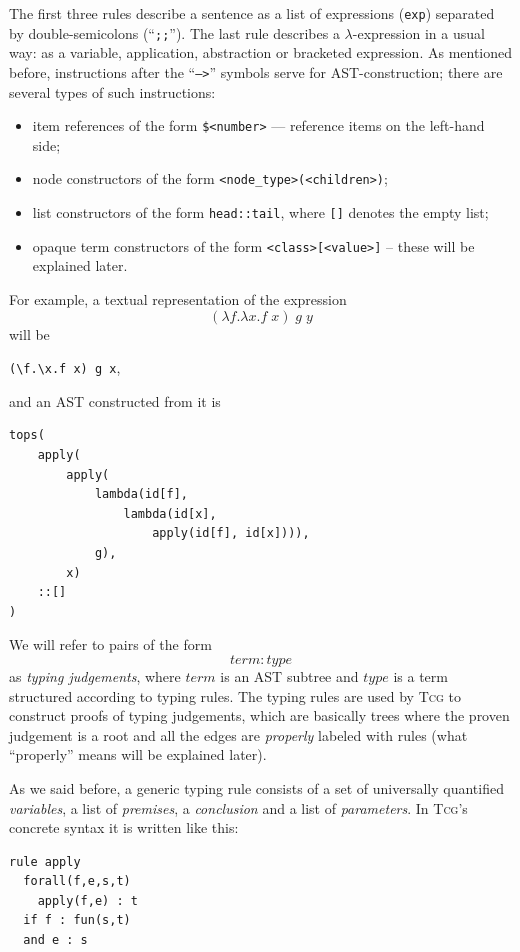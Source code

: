\documentclass[a4paper,12pt]{article}
\newcommand{\Tcg}{\textsc{Tcg}}
\newcommand{\code}[1]{\texttt{#1}}
\newcounter{premise}
\begin{document}
The first three rules describe a sentence as a list of expressions (\code{exp}) separated by double-semicolons (``\code{;;}''). The last rule describes a $\lambda$-expression in a usual way: as a variable, application, abstraction or bracketed expression. As mentioned before, instructions after the ``\code{-->}'' symbols serve for AST-construction; there are several types of such instructions:
\begin{itemize}
 \item item references of the form \code{\$<number>} --- reference items on the left-hand side;
 \item node constructors of the form \code{<node_type>(<children>)};
 \item list constructors of the form \code{head::tail}, where \code{[]} denotes the empty list;
 \item opaque term constructors of the form \code{<class>[<value>]} -- these will be explained later.
\end{itemize}

For example, a textual representation of the expression 
$$(\lambda f.\lambda x. f\; x)\; g\; y$$
will be 
\begin{center}
\code{(\textbackslash f.\textbackslash x.f x) g x},
\end{center}
and an AST constructed from it is%
\begin{verbatim}
tops(
    apply(
        apply(
            lambda(id[f], 
                lambda(id[x], 
                    apply(id[f], id[x]))),
            g),
        x)
    ::[]
)
\end{verbatim}

We will refer to pairs of the form
$$term : type$$
as \emph{typing judgements}, where $term$ is an AST subtree and $type$ is a term structured according to typing rules. The typing rules are used by \Tcg{} to construct proofs of typing judgements, which are basically trees where the proven judgement is a root and all the edges are \emph{properly} labeled with rules (what ``properly'' means will be explained later). 

As we said before, a generic typing rule consists of a set of universally quantified \emph{variables}, a list of \emph{premises}, a \emph{conclusion} and a list of \emph{parameters}. In \Tcg{}'s concrete syntax it is written like this:
\begin{verbatim}
rule apply
  forall(f,e,s,t)
    apply(f,e) : t
  if f : fun(s,t)
  and e : s
\end{verbatim}
\end{document}
